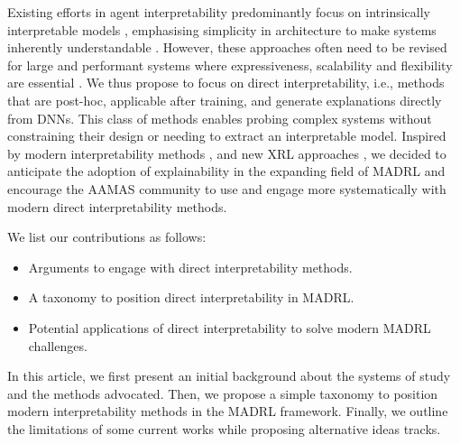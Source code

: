 Existing efforts in agent interpretability predominantly focus on intrinsically interpretable models \cite{Heuillet2020ExplainabilityID,Milani2023ExplainableRL,Qing2022ASO,Hickling2022ExplainabilityID,Bekkemoen2023ExplainableRL}, emphasising simplicity in architecture to make systems inherently understandable \cite{Chattopadhyay2022InterpretableBD,Rodriguez2024DesignPF}. However, these approaches often need to be revised for large and performant systems where expressiveness, scalability and flexibility are essential \cite{Rudin2021InterpretableML}. 
We thus propose to focus on direct interpretability, i.e., methods that are post-hoc, applicable after training, and generate explanations directly from DNNs. This class of methods enables probing complex systems without constraining their design or needing to extract an interpretable model.
Inspired by modern interpretability methods \cite{zou2023representation,Cunningham2023SparseAF, Dunefsky2024TranscodersFI,Katz2024BackwardLP}, and new XRL approaches \cite{Levin2023ClusteredPD,Seong2024SelfSupervisedIE,Lange2024InterpretableBR}, we decided to anticipate the adoption of explainability in the expanding field of MADRL and encourage the AAMAS community to use and engage more systematically with modern direct interpretability methods.

We list our contributions as follows:
\begin{itemize}
    \item Arguments to engage with
    direct interpretability methods.
    \item A taxonomy to position direct interpretability in MADRL.
    \item Potential applications of direct interpretability to solve modern MADRL challenges.
\end{itemize}
In this article, we first present an initial background about the systems of study and the methods advocated. Then, we propose a simple taxonomy to position modern interpretability methods in the MADRL framework. Finally, we outline the limitations of some current works while proposing alternative ideas tracks.

